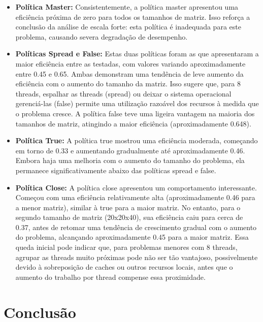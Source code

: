 \documentclass[a4paper, 12pt]{article}
\begin{document}
	\begin{itemize}
		\item \textbf{Política Master:} Consistentemente, a política master apresentou uma eficiência próxima de zero para todos os tamanhos de matriz. Isso reforça a conclusão da análise de escala forte: esta política é inadequada para este problema, causando severa degradação de desempenho.
		
		\item \textbf{Políticas Spread e False:} Estas duas políticas foram as que apresentaram a maior eficiência entre as testadas, com valores variando aproximadamente entre 0.45 e 0.65. Ambas demonstram uma tendência de leve aumento da eficiência com o aumento do tamanho da matriz. Isso sugere que, para 8 threads, espalhar as threads (spread) ou deixar o sistema operacional gerenciá-las (false) permite uma utilização razoável dos recursos à medida que o problema cresce. A política false teve uma ligeira vantagem na maioria dos tamanhos de matriz, atingindo a maior eficiência (aproximadamente 0.648).
		
		\item \textbf{Política True:} A política true mostrou uma eficiência moderada, começando em torno de 0.33 e aumentando gradualmente até aproximadamente 0.46. Embora haja uma melhoria com o aumento do tamanho do problema, ela permanece significativamente abaixo das políticas spread e false.
		
		\item \textbf{Política Close:} A política close apresentou um comportamento interessante. Começou com uma eficiência relativamente alta (aproximadamente 0.46 para a menor matriz), similar à true para a maior matriz. No entanto, para o segundo tamanho de matriz (20x20x40), sua eficiência caiu para cerca de 0.37, antes de retomar uma tendência de crescimento gradual com o aumento do problema, alcançando aproximadamente 0.45 para a maior matriz. Essa queda inicial pode indicar que, para problemas menores com 8 threads, agrupar as threads muito próximas pode não ser tão vantajoso, possivelmente devido à sobreposição de caches ou outros recursos locais, antes que o aumento do trabalho por thread compense essa proximidade.
	\end{itemize}
	
	
	\section{Conclusão}
\end{document}
